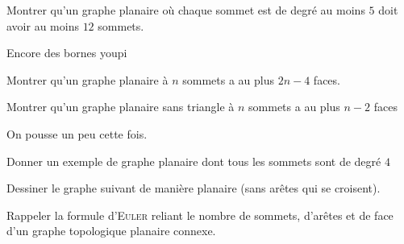 \documentclass[french]{report}
\begin{document}
\begin{exo}
    Montrer qu'un graphe planaire où chaque sommet est de degré au moins \(5\) doit avoir
    au moins \(12\) sommets.
\end{exo}

\begin{exo}
    Encore des bornes youpi
    \begin{q}{1}
        Montrer qu'un graphe planaire à \(n\) sommets a au plus \(2n-4\) faces.
    \end{q}
    \begin{q}{2}
        Montrer qu'un graphe planaire sans triangle à \(n\) sommets a au plus \(n-2\)
        faces
    \end{q}
\end{exo}

\begin{exo}
    On pousse un peu cette fois.
    \begin{q}{1}
        Donner un exemple de graphe planaire dont tous les sommets sont de degré \(4\)
    \end{q}
    \begin{q}{2}
        Dessiner le graphe suivant de manière planaire (sans arêtes qui se croisent).
    \end{q}
    \begin{q}{3}
        Rappeler la formule d'\textsc{Euler} reliant le nombre de sommets, d'arêtes
        et de face d'un graphe topologique planaire connexe.
    \end{q}
\end{exo}
\end{document}
